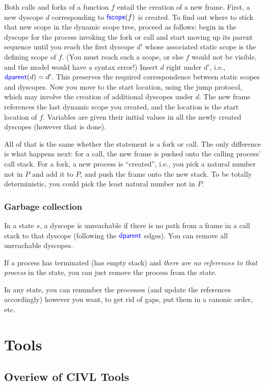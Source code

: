\documentclass[11pt, oneside, letterpaper]{book}
\begin{document}
Both calls and forks of a function $f$ entail the creation of a new
frame. First, a new dyscope $d$ corresponding to $\textsf{\textcolor{blue}{\textup{fscope}}}(f)$ is
created. To find out where to stick that new scope in the dynamic
scope tree, proceed as follows: begin in the dyscope for the
process invoking the fork or call and start moving up its parent
sequence until you reach the first dyscope $d'$ whose associated
static scope is the defining scope of $f$. (You must reach such a
scope, or else $f$ would not be visible, and the model would have a
syntax error!) Insert $d$ right under $d'$, i.e.,
$\textsf{\textcolor{blue}{\textup{dparent}}}(d)=d'$. This preserves the required correspondence between
static scopes and dyscopes. Now you move to the start location,
using the jump protocol, which may involve the creation of additional
dyscopes under $d$. The new frame references the last dynamic
scope you created, and the location is the start location of $f$.
Variables are given their initial values in all the newly created
dyscopes (however that is done).

All of that is the same whether the statement is a fork or call. The
only difference is what happens next: for a call, the new frame is
pushed onto the calling process' call stack. For a fork, a new process
is ``created'', i.e., you pick a natural number not in $P$ and
add it to $P$, and push the frame onto the new stack.   To be totally
deterministic, you could pick the least natural number not in $P$.

\section{Garbage collection}

In a state $s$, a dyscope is unreachable if there is no path
from a frame in a call stack to that dyscope (following the
$\textsf{\textcolor{blue}{\textup{dparent}}}$ edges).  You can remove all unreachable dyscopes.

If a process has terminated (has empty stack) and \emph{there are no
references to that process} in the state, you can just remove the process
from the state.

In any state, you can renumber the processes (and update the
references accordingly) however you want, to get rid of gaps, put them
in a canonic order, etc.


\part{Tools}

\chapter{Overiew of CIVL Tools}
\end{document}
